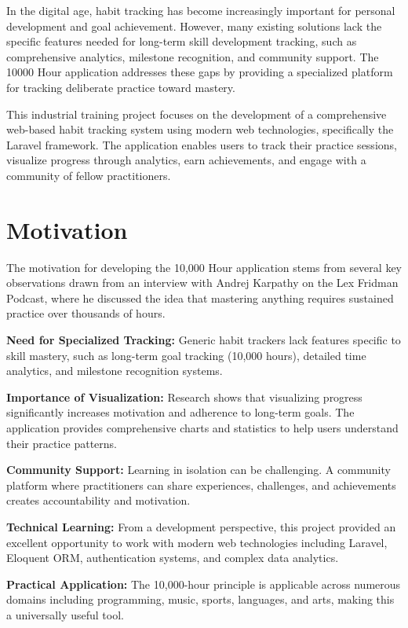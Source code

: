 \documentclass[12pt,a4paper]{report}
\newcommand{\JustifiedNormal}{\fontsize{12}{14}\selectfont\justifying\setlength{\parindent}{0pt}}
\begin{document}
In the digital age, habit tracking has become increasingly important for personal development and goal achievement. However, many existing solutions lack the specific features needed for long-term skill development tracking, such as comprehensive analytics, milestone recognition, and community support. The 10000 Hour application addresses these gaps by providing a specialized platform for tracking deliberate practice toward mastery.

This industrial training project focuses on the development of a comprehensive web-based habit tracking system using modern web technologies, specifically the Laravel framework. The application enables users to track their practice sessions, visualize progress through analytics, earn achievements, and engage with a community of fellow practitioners.

\section{Motivation}
\JustifiedNormal
The motivation for developing the 10,000 Hour application stems from several key observations drawn from an interview with Andrej Karpathy on the Lex Fridman Podcast, where he discussed the idea that mastering anything requires sustained practice over thousands of hours.

\textbf{Need for Specialized Tracking:} Generic habit trackers lack features specific to skill mastery, such as long-term goal tracking (10,000 hours), detailed time analytics, and milestone recognition systems.

\textbf{Importance of Visualization:} Research shows that visualizing progress significantly increases motivation and adherence to long-term goals. The application provides comprehensive charts and statistics to help users understand their practice patterns.

\textbf{Community Support:} Learning in isolation can be challenging. A community platform where practitioners can share experiences, challenges, and achievements creates accountability and motivation.

\textbf{Technical Learning:} From a development perspective, this project provided an excellent opportunity to work with modern web technologies including Laravel, Eloquent ORM, authentication systems, and complex data analytics.

\textbf{Practical Application:} The 10,000-hour principle is applicable across numerous domains including programming, music, sports, languages, and arts, making this a universally useful tool.
\end{document}
